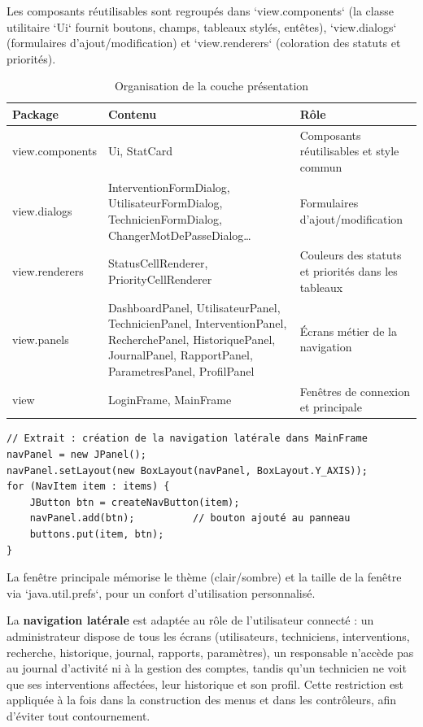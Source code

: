 \documentclass[11pt,a4paper]{report}
\begin{document}
Les composants réutilisables sont regroupés dans `view.components` (la classe utilitaire `Ui` fournit boutons, champs, tableaux stylés, entêtes), `view.dialogs` (formulaires d'ajout/modification) et `view.renderers` (coloration des statuts et priorités).
\begin{table}[htbp]\centering\small
\begin{tabularx}{\textwidth}{|X|X|X|}
\hline\rowcolor{hdr}\textbf{Package} & \textbf{Contenu} & \textbf{Rôle}\\ \hline
view.components & Ui, StatCard & Composants réutilisables et style commun\\ \hline
view.dialogs & InterventionFormDialog, UtilisateurFormDialog, TechnicienFormDialog, ChangerMotDePasseDialog… & Formulaires d'ajout/modification\\ \hline
view.renderers & StatusCellRenderer, PriorityCellRenderer & Couleurs des statuts et priorités dans les tableaux\\ \hline
view.panels & DashboardPanel, UtilisateurPanel, TechnicienPanel, InterventionPanel, RecherchePanel, HistoriquePanel, JournalPanel, RapportPanel, ParametresPanel, ProfilPanel & Écrans métier de la navigation\\ \hline
view & LoginFrame, MainFrame & Fenêtres de connexion et principale\\ \hline
\end{tabularx}
\caption{Organisation de la couche présentation}
\end{table}
\begin{lstlisting}
// Extrait : création de la navigation latérale dans MainFrame
navPanel = new JPanel();
navPanel.setLayout(new BoxLayout(navPanel, BoxLayout.Y_AXIS));
for (NavItem item : items) {
    JButton btn = createNavButton(item);
    navPanel.add(btn);          // bouton ajouté au panneau
    buttons.put(item, btn);
}
\end{lstlisting}

La fenêtre principale mémorise le thème (clair/sombre) et la taille de la fenêtre via `java.util.prefs`, pour un confort d'utilisation personnalisé.

La \textbf{navigation latérale} est adaptée au rôle de l'utilisateur connecté : un administrateur dispose de tous les écrans (utilisateurs, techniciens, interventions, recherche, historique, journal, rapports, paramètres), un responsable n'accède pas au journal d'activité ni à la gestion des comptes, tandis qu'un technicien ne voit que ses interventions affectées, leur historique et son profil. Cette restriction est appliquée à la fois dans la construction des menus et dans les contrôleurs, afin d'éviter tout contournement.
\end{document}
